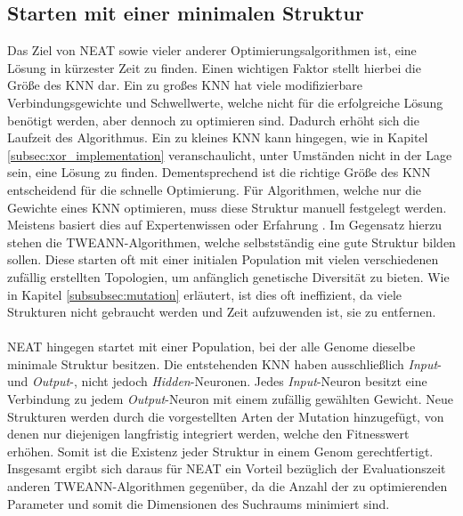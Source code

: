 \subsection{Starten mit einer minimalen Struktur}
\label{subsec:neat_minimal_structure}
Das Ziel von \ac{NEAT} sowie vieler anderer Optimierungsalgorithmen ist, eine Lösung in kürzester Zeit zu finden. Einen wichtigen Faktor stellt hierbei die Größe des \ac{KNN} dar. Ein zu großes \ac{KNN} hat viele modifizierbare Verbindungsgewichte und Schwellwerte, welche nicht für die erfolgreiche Lösung benötigt werden, aber dennoch zu optimieren sind. Dadurch erhöht sich die Laufzeit des Algorithmus. Ein zu kleines \ac{KNN} kann hingegen, wie in Kapitel \ref{subsec:xor_implementation} veranschaulicht, unter Umständen nicht in der Lage sein, eine Lösung zu finden. Dementsprechend ist die richtige Größe des \ac{KNN} entscheidend für die schnelle Optimierung. Für Algorithmen, welche nur die Gewichte eines \ac{KNN} optimieren, muss diese Struktur manuell festgelegt werden. Meistens basiert dies auf Expertenwissen oder Erfahrung \cite{stanley2017oreilly}. Im Gegensatz hierzu stehen die \ac{TWEANN}-Algorithmen, welche selbstständig eine gute Struktur bilden sollen. Diese starten oft mit einer initialen Population mit vielen verschiedenen zufällig erstellten Topologien, um anfänglich genetische Diversität zu bieten. Wie in Kapitel \ref{subsubsec:mutation} erläutert, ist dies oft ineffizient, da viele Strukturen nicht gebraucht werden und Zeit aufzuwenden ist, sie zu entfernen.
\\\\
\ac{NEAT} hingegen startet mit einer Population, bei der alle Genome dieselbe minimale Struktur besitzen. Die entstehenden \ac{KNN} haben ausschließlich \emph{Input}- und \emph{Output}-, nicht jedoch \emph{Hidden}-Neuronen. Jedes \emph{Input}-Neuron besitzt eine Verbindung zu jedem \emph{Output}-Neuron mit einem zufällig gewählten Gewicht. Neue Strukturen werden durch die vorgestellten Arten der Mutation hinzugefügt, von denen nur diejenigen langfristig integriert werden, welche den Fitnesswert erhöhen. Somit ist die Existenz jeder Struktur in einem Genom gerechtfertigt. Insgesamt ergibt sich daraus für \ac{NEAT} ein Vorteil bezüglich der Evaluationszeit anderen \ac{TWEANN}-Algorithmen gegenüber, da die Anzahl der zu optimierenden Parameter und somit die Dimensionen des Suchraums minimiert sind.